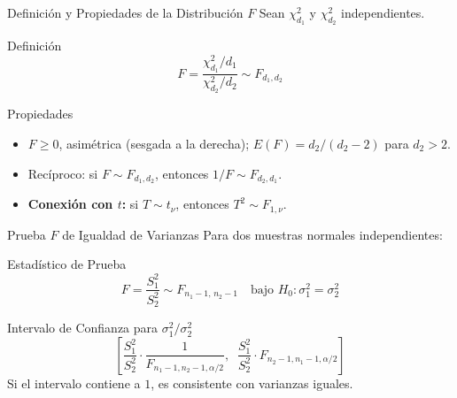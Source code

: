 \documentclass[10pt, aspectratio=169]{beamer}
\begin{document}
\begin{frame}{Definición y Propiedades de la Distribución $F$}
  \footnotesize
  Sean $\chi^2_{d_1}$ y $\chi^2_{d_2}$ independientes. \pause

  \vspace{0.1cm}
  \begin{block}{Definición}
    $$F = \dfrac{\chi^2_{d_1}/d_1}{\chi^2_{d_2}/d_2} \sim F_{d_1,d_2}$$
  \end{block}

  \vspace{0.1cm}
  \pause
  \begin{alertblock}{Propiedades}
    \begin{itemize}\itemsep=0.05cm
      \item $F\ge 0$, asimétrica (sesgada a la derecha); $E(F)=d_2/(d_2-2)$ para $d_2>2$.
      \item Recíproco: si $F\sim F_{d_1,d_2}$, entonces $1/F\sim F_{d_2,d_1}$.
      \item \textbf{Conexión con $t$:} si $T\sim t_\nu$, entonces $T^2\sim F_{1,\nu}$.
    \end{itemize}
  \end{alertblock}
\end{frame}

\begin{frame}{Prueba $F$ de Igualdad de Varianzas}
  \footnotesize
  Para dos muestras normales independientes: \pause

  \vspace{0.1cm}
  \begin{block}{Estadístico de Prueba}
    $$F = \dfrac{S_1^2}{S_2^2} \sim F_{n_1-1,\,n_2-1} \quad \text{bajo } H_0:\sigma_1^2=\sigma_2^2$$
  \end{block}

  \vspace{0.1cm}
  \pause
  \begin{alertblock}{Intervalo de Confianza para $\sigma_1^2/\sigma_2^2$}
    $$\left[\dfrac{S_1^2}{S_2^2}\cdot\dfrac{1}{F_{n_1-1,n_2-1,\alpha/2}},\;\; \dfrac{S_1^2}{S_2^2}\cdot F_{n_2-1,n_1-1,\alpha/2}\right]$$
    Si el intervalo contiene a $1$, es consistente con varianzas iguales.
  \end{alertblock}
\end{frame}
\end{document}
